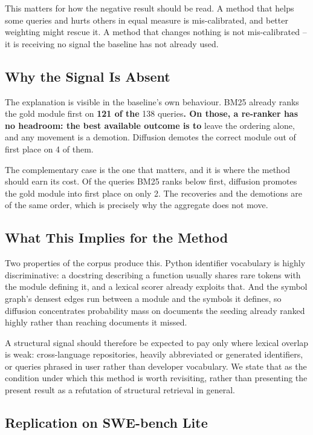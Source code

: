 \documentclass[10pt,twocolumn,letterpaper]{article}
\begin{document}
This matters for how the negative result should be read. A method that helps some
queries and hurts others in equal measure is mis-calibrated, and better weighting
might rescue it. A method that changes nothing is not mis-calibrated -- it is
receiving no signal the baseline has not already used.


\subsection{Why the Signal Is Absent}


The explanation is visible in the baseline's own behaviour. BM25 already ranks the
gold module first on \textbf{121 of the}
138
queries\textbf{. On those, a re-ranker has no headroom: the best available outcome is to}
leave the ordering alone, and any movement is a demotion. Diffusion demotes the
correct module out of first place on 4 of
them.

The complementary case is the one that matters, and it is where the method should
earn its cost. Of the queries BM25 ranks below first, diffusion promotes the gold
module into first place on only 2. The
recoveries and the demotions are of the same order, which is precisely why the
aggregate does not move.


\subsection{What This Implies for the Method}


Two properties of the corpus produce this. Python identifier vocabulary is highly
discriminative: a docstring describing a function usually shares rare tokens with
the module defining it, and a lexical scorer already exploits that. And the symbol
graph's densest edges run between a module and the symbols it defines, so diffusion
concentrates probability mass on documents the seeding already ranked highly rather
than reaching documents it missed.

A structural signal should therefore be expected to pay only where lexical overlap
is weak: cross-language repositories, heavily abbreviated or generated identifiers,
or queries phrased in user rather than developer vocabulary. We state that as the
condition under which this method is worth revisiting, rather than presenting the
present result as a refutation of structural retrieval in general.



\subsection{Replication on SWE-bench Lite}
\end{document}
